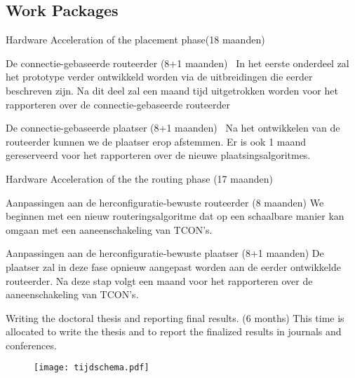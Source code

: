 \documentclass[a4paper,oneside,12pt]{article}
\begin{document}
\subsection{Work Packages}
\begin{description*}
\item[Hardware Acceleration of the placement phase(18 maanden)]\

\begin{description*}
\item[De connectie-gebaseerde routeerder (8+1 maanden)]\
In het eerste onderdeel zal het prototype verder ontwikkeld worden via de uitbreidingen die eerder beschreven zijn. Na dit deel zal een maand tijd uitgetrokken worden voor het rapporteren over de connectie-gebaseerde routeerder
\item[De connectie-gebaseerde plaatser (8+1 maanden)]\
Na het ontwikkelen van de routeerder kunnen we de plaatser erop afstemmen. Er is ook 1 maand gereserveerd voor het rapporteren over de nieuwe plaatsingsalgoritmes.
\end{description*}

\item[Hardware Acceleration of the the routing phase (17 maanden)]\

\begin{description*}
\item[Aanpassingen aan de herconfiguratie-bewuste routeerder (8 maanden)] 
We beginnen met een nieuw routeringsalgoritme dat op een schaalbare manier kan omgaan met een aaneenschakeling van TCON's.
\item[Aanpassingen aan de herconfiguratie-bewuste plaatser (8+1 maanden)]
De plaatser zal in deze fase opnieuw aangepast worden aan de eerder ontwikkelde routeerder. Na deze stap volgt een maand voor het rapporteren over de aaneenschakeling van TCON's.
\end{description*}

\item[Writing the doctoral thesis and reporting final results. (6 months)] This time is allocated to write the thesis and to report the finalized results in journals and conferences.  

\end{description*}

\begin{figure}[ht]
\centering
\texttt{[image: tijdschema.pdf]}
\end{figure}

\newpage
\end{document}
